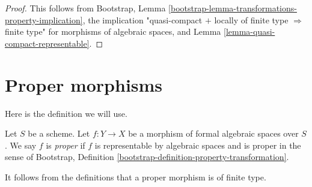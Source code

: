 \begin{proof}
This follows from Bootstrap, Lemma
\ref{bootstrap-lemma-transformations-property-implication},
the implication "quasi-compact $+$ locally of finite type
$\Rightarrow$ finite type" for morphisms of algebraic spaces, and
Lemma \ref{lemma-quasi-compact-representable}.
\end{proof}




\section{Proper morphisms}
\label{section-proper}

\noindent
Here is the definition we will use.

\begin{definition}
\label{definition-proper}
Let $S$ be a scheme. Let $f : Y \to X$ be a morphism of formal algebraic
spaces over $S$. We say $f$ is {\it proper}
if $f$ is representable by algebraic spaces and is proper in the sense of
Bootstrap, Definition \ref{bootstrap-definition-property-transformation}.
\end{definition}

\noindent
It follows from the definitions that a proper morphism is of finite type.




















